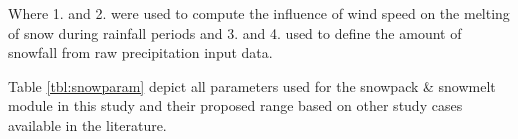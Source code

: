 Where 1. and 2. were used to compute the influence of wind speed on the melting of snow during rainfall periods and 3. and 4. used to define the amount of snowfall from raw precipitation input data.



Table \ref{tbl:snowparam} depict all parameters used for the snowpack \& snowmelt module in this study and their proposed range based on other study cases available in the literature. 


